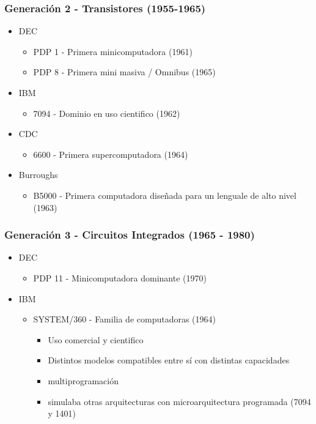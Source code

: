 \subsubsection{Generación 2 - Transistores (1955-1965)}
\begin{itemize}
\item DEC
	\begin{itemize}
	\item PDP 1 - Primera minicomputadora (1961)
	\item PDP 8 - Primera mini masiva / Omnibus (1965)
	\end{itemize}
\item IBM
	\begin{itemize}
	\item 7094 - Dominio en uso cientifico (1962)
	\end{itemize}
\item CDC
	\begin{itemize}
	\item 6600 - Primera supercomputadora (1964)
	\end{itemize}
\item Burroughs
	\begin{itemize}
	\item B5000 - Primera computadora diseñada para un lenguale de alto nivel (1963)
	\end{itemize}
\end{itemize}

\subsubsection{Generación 3 - Circuitos Integrados (1965 - 1980)}
\begin{itemize}
\item DEC
	\begin{itemize}
	\item PDP 11 - Minicomputadora dominante (1970)
	\end{itemize}
\item IBM
	\begin{itemize}
	\item SYSTEM/360 - Familia de computadoras (1964)
		\begin{itemize}
		\item Uso comercial y cientifico
		\item Distintos modelos compatibles entre sí con distintas capacidades
		\item multiprogramación
		\item simulaba otras arquitecturas con microarquitectura programada (7094 y 1401)
		\end{itemize}
	\end{itemize}
\end{itemize}

